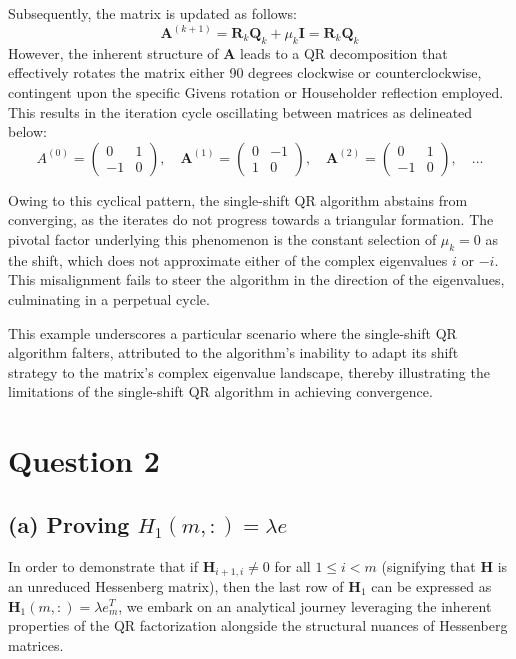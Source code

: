 \documentclass{article}
\begin{document}
Subsequently, the matrix is updated as follows:
\begin{equation}
\boldsymbol{A}^{(k+1)} = \boldsymbol{R}_k \boldsymbol{Q}_k + \mu_k \mathbf{I} = \boldsymbol{R}_k \boldsymbol{Q}_k
\end{equation}
However, the inherent structure of $\boldsymbol{A}$ leads to a QR decomposition that effectively rotates the matrix either 90 degrees clockwise or counterclockwise, contingent upon the specific Givens rotation or Householder reflection employed. This results in the iteration cycle oscillating between matrices as delineated below:
\begin{equation}
A^{(0)} = \left(\begin{array}{cc}
0 & 1 \\
-1 & 0
\end{array}\right), \quad \boldsymbol{A}^{(1)} = \left(\begin{array}{cc}
0 & -1 \\
1 & 0
\end{array}\right), \quad \boldsymbol{A}^{(2)} = \left(\begin{array}{cc}
0 & 1 \\
-1 & 0
\end{array}\right), \quad \ldots
\end{equation}

Owing to this cyclical pattern, the single-shift QR algorithm abstains from converging, as the iterates do not progress towards a triangular formation. The pivotal factor underlying this phenomenon is the constant selection of $\mu_k = 0$ as the shift, which does not approximate either of the complex eigenvalues $i$ or $-i$. This misalignment fails to steer the algorithm in the direction of the eigenvalues, culminating in a perpetual cycle.

This example underscores a particular scenario where the single-shift QR algorithm falters, attributed to the algorithm's inability to adapt its shift strategy to the matrix's complex eigenvalue landscape, thereby illustrating the limitations of the single-shift QR algorithm in achieving convergence.


\section{Question 2}
\subsection*{(a) Proving \(H_1(m,:) = \lambda e\)}
In order to demonstrate that if $\boldsymbol{H}_{i+1, i} \neq 0$ for all $1 \leq i < m$ (signifying that $\boldsymbol{H}$ is an unreduced Hessenberg matrix), then the last row of $\boldsymbol{H}_1$ can be expressed as $\boldsymbol{H}_1(m,:) = \lambda e_m^T$, we embark on an analytical journey leveraging the inherent properties of the QR factorization alongside the structural nuances of Hessenberg matrices.
\end{document}
